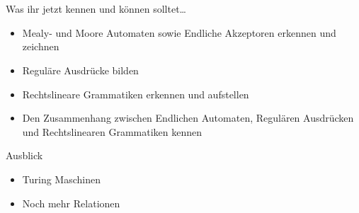 

\section{}
	\begin{frame}{Was ihr jetzt kennen und können solltet\dots}
			\begin{itemize}
				\item Mealy- und Moore Automaten sowie Endliche Akzeptoren erkennen und zeichnen
				\item Reguläre Ausdrücke bilden
				\item Rechtslineare Grammatiken erkennen und aufstellen
				\item Den Zusammenhang zwischen Endlichen Automaten, Regulären Ausdrücken und Rechtslinearen Grammatiken kennen
			\end{itemize}
	\end{frame}
	\begin{frame}{Ausblick}
		\begin{itemize}
			\item Turing Maschinen
			\item Noch mehr Relationen
		\end{itemize}
	\end{frame}
\section{}
\questionframe
\lastframe
{}
